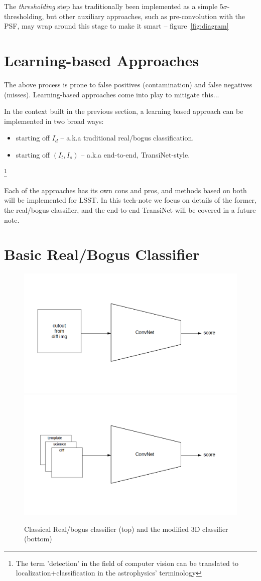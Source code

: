 The \emph{thresholding} step has traditionally been implemented as a simple $5\sigma$-thresholding, but other auxiliary approaches, such as pre-convolution with the PSF, may wrap around this stage to make it smart -- figure~\ref{fig:diagram}


\section{Learning-based Approaches}
\label{sec:learning}
The above process is prone to false positives (contamination) and false negatives (misses). Learning-based approaches come into play to mitigate this...

In the context built in the previous section, a learning based approach can be implemented in two broad ways:
\begin{itemize}
\item starting off $I_d$ -- a.k.a traditional real/bogus classification.
\item starting off $(I_t,I_s)$ -- a.k.a end-to-end, TransiNet-style.
\end{itemize}

\footnote{The term 'detection' in the field of computer vision can be translated to localization+classification in the astrophysics' terminology}


Each of the approaches has its own cons and pros, and methods based on both will be implemented for LSST. In this tech-note we focus on details of the former, the real/bogus classifier, and the end-to-end TransiNet will be covered in a future note.


\section{Basic Real/Bogus Classifier}

\begin{figure}[h]
  \centering
  \includegraphics[width=.6\textwidth]{material/rb-classifier}
  \includegraphics[width=.6\textwidth]{material/rb-classifier-mod}
  \caption{Classical Real/bogus classifier (top) and the modified 3D classifier (bottom)}
  \label{fig:rbdiagram}
\end{figure}

